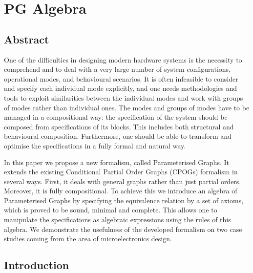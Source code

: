\section{PG Algebra}

\subsection{Abstract}

One of the difficulties in designing modern hardware systems is the
necessity to comprehend and to deal with a very large number of system
configurations, operational modes, and behavioural scenarios. It is
often infeasible to consider and specify each individual mode explicitly,
and one needs methodologies and tools to exploit similarities between
the individual modes and work with groups of modes rather than individual
ones. The modes and groups of modes have to be managed in a compositional
way: the specification of the system should be composed from specifications
of its blocks. This includes both structural and behavioural composition.
Furthermore, one should be able to transform and optimise the specifications
in a fully formal and natural way.

In this paper we propose a new formalism, called Parameterised Graphs.
It extends the existing Conditional Partial Order Graphs (CPOGs) formalism
in several ways. First, it deals with general graphs rather than just
partial orders. Moreover, it is fully compositional. To achieve this
we introduce an algebra of Parameterised Graphs by specifying the
equivalence relation by a set of axioms, which is proved to be sound,
minimal and complete. This allows one to manipulate the specifications
as algebraic expressions using the rules of this algebra. We demonstrate
the usefulness of the developed formalism on two case studies coming
from the area of microelectronics design.

\subsection{Introduction}

